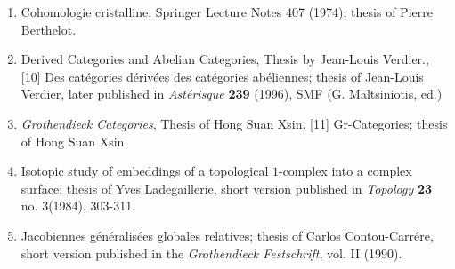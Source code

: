 \documentclass[12pt]{article}
\theoremstyle{plain}
\theoremstyle{definition}
\numberwithin{equation}{section}
\begin{document}
\begin{enumerate}
\item Cohomologie cristalline, Springer Lecture Notes 407 (1974); thesis of Pierre Berthelot.
\item Derived Categories and Abelian Categories, Thesis by Jean-Louis Verdier.,
[10] Des cat\'egories d\'eriv\'ees des cat\'egories ab\'eliennes; thesis of Jean-Louis Verdier, later
published in \emph{Ast\'erisque} {\bf 239} (1996), SMF (G. Maltsiniotis, ed.)
\item \emph{Grothendieck Categories}, Thesis of Hong Suan Xsin.
[11] Gr-Categories; thesis of Hong Suan Xsin.
\item Isotopic study of embeddings of a topological $1$-complex into a complex surface; thesis
of Yves Ladegaillerie, short version published in \emph{Topology} {\bf 23} no. 3(1984), 303-311.
\item Jacobiennes g\'en\'eralis\'ees globales relatives; thesis of Carlos Contou-Carr\'ere, short version
published in the \emph{Grothendieck Festschrift}, vol. II (1990).
\end{enumerate}
\end{document}
